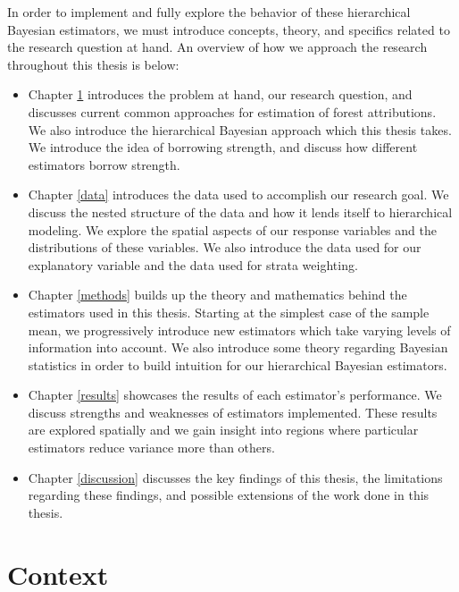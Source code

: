 \documentclass[12pt,twoside]{reedthesis}
\providecommand{\tightlist}{%
  \setlength{\itemsep}{0pt}\setlength{\parskip}{0pt}}
\begin{document}
In order to implement and fully explore the behavior of these hierarchical Bayesian estimators, we must introduce concepts, theory, and specifics related to the research question at hand. An overview of how we approach the research throughout this thesis is below:
\begin{itemize}
\tightlist
\item
  Chapter \ref{context} introduces the problem at hand, our research question, and discusses current common approaches for estimation of forest attributions. We also introduce the hierarchical Bayesian approach which this thesis takes. We introduce the idea of borrowing strength, and discuss how different estimators borrow strength.
\item
  Chapter \ref{data} introduces the data used to accomplish our research goal. We discuss the nested structure of the data and how it lends itself to hierarchical modeling. We explore the spatial aspects of our response variables and the distributions of these variables. We also introduce the data used for our explanatory variable and the data used for strata weighting.
\item
  Chapter \ref{methods} builds up the theory and mathematics behind the estimators used in this thesis. Starting at the simplest case of the sample mean, we progressively introduce new estimators which take varying levels of information into account. We also introduce some theory regarding Bayesian statistics in order to build intuition for our hierarchical Bayesian estimators.
\item
  Chapter \ref{results} showcases the results of each estimator's performance. We discuss strengths and weaknesses of estimators implemented. These results are explored spatially and we gain insight into regions where particular estimators reduce variance more than others.
\item
  Chapter \ref{discussion} discusses the key findings of this thesis, the limitations regarding these findings, and possible extensions of the work done in this thesis.
\end{itemize}
\hypertarget{context}{%
\chapter{Context}\label{context}}
\end{document}
